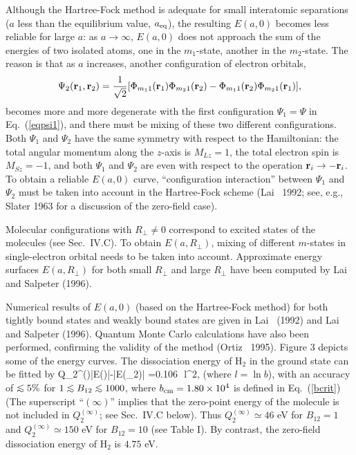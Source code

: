 Although the Hartree-Fock method is adequate for small interatomic 
separations ($a$ less than the equilibrium value, $a_{\rm eq}$),
the resulting $E(a,0)$ becomes less reliable for large $a$: 
as $a\rightarrow\infty$, $E(a,0)$ does not approach the sum of the 
energies of two isolated atoms, one in the $m_1$-state, another in 
the $m_2$-state. The reason is that as $a$ increases, 
another configuration of electron orbitals,
\begin{equation}
\Psi_2 ({\bf r}_1,{\bf r}_2)={1 \over \sqrt 2}
[\Phi_{m_11}({\bf r}_1)\Phi_{m_21}({\bf r}_2)
-\Phi_{m_11}({\bf r}_2)\Phi_{m_21}({\bf r}_1)],\end{equation}
becomes more and more degenerate with the first configuration 
$\Psi_1=\Psi$ in Eq.~(\ref{eqpsi1}), 
and there must be mixing of these two different configurations.
Both $\Psi_1$ and $\Psi_2$ have the 
same symmetry with respect to the Hamiltonian:
the total angular momentum along the $z$-axis is $M_{Lz}=1$, the 
total electron spin is $M_{Sz}=-1$, and both $\Psi_1$ and 
$\Psi_2$ are even with respect to the operation ${\bf r}_i\rightarrow -{\bf r}_i$. 
To obtain a reliable $E(a,0)$ curve, ``configuration interaction'' 
between $\Psi_1$ and $\Psi_2$ must be taken into account in the
Hartree-Fock scheme (Lai \etal~1992; see, e.g., Slater 1963 for 
a discussion of the zero-field case). 

Molecular configurations with $R_\perp\neq  0$ correspond to excited states of
the molecules (see Sec.~IV.C). To obtain $E(a,R_\perp)$, 
mixing of different $m$-states in single-electron orbital
needs to be taken into account. Approximate energy surfaces 
$E(a,R_\perp)$ for both small $R_\perp$ and large $R_\perp$
have been computed by Lai and Salpeter (1996).

Numerical results of $E(a,0)$ (based on the Hartree-Fock
method) for both tightly bound states and weakly bound states are given in 
Lai \etal~(1992) and Lai and Salpeter (1996). Quantum Monte Carlo calculations
have also been performed, confirming the validity of the 
method (Ortiz \etal~1995). Figure 3 depicts some of the energy curves. The
dissociation energy of H$_2$ in the ground state can be fitted by
\be
Q_2^{(\infty)}|E(\rH)|-|E(\rH_2)|
=0.106\,\,
l^2,
\label{q2infty}\ee
(where $l=\ln b$), with an accuracy of $\lo 5\%$ for $1\lo B_{12}\lo 1000$, 
where $b_{\rm cm}=1.80\times 10^4$ is defined in Eq.~(\ref{bcrit})
(The superscript ``$(\infty)$'' implies that the zero-point energy 
of the molecule is not included in $Q_2^{(\infty)}$; see Sec.~IV.C below).
Thus $Q_2^{(\infty)}\simeq 46$ eV for $B_{12}=1$ and 
$Q_2^{(\infty)}\simeq 150$ eV for $B_{12}=10$ (see Table I).
By contrast, the zero-field dissociation energy of H$_2$ is $4.75$ eV.

